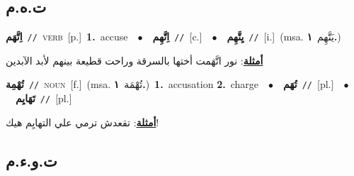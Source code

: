 \documentclass[10pt,a4paper,twoside]{article} %
\begin{document}
\begin{multicols}{2}
\vspace{-3mm}
\subsection*{\color{blue}\foreignlanguage{arabic}{ت.ه.م}\color{blue}{}} 

{\setlength\topsep{0pt}\textbf{\foreignlanguage{arabic}{اِتَّهَم}}\ {\color{gray}\texttt{//}\color{black}}\ \textsc{verb}\ [p.]\ \textbf{1.}~accuse\ \ $\bullet$\ \ \setlength\topsep{0pt}\textbf{\foreignlanguage{arabic}{اِتَّهِم}}\ {\color{gray}\texttt{//}\color{black}}\ [c.]\ \ $\bullet$\ \ \setlength\topsep{0pt}\textbf{\foreignlanguage{arabic}{يِتَّهِم}}\ {\color{gray}\texttt{//}\color{black}}\ [i.]\ \color{gray}(msa. \foreignlanguage{arabic}{يَتَّهِم}~\foreignlanguage{arabic}{\textbf{١.}})\color{black}\  \begin{flushright}\color{gray}\foreignlanguage{arabic}{\textbf{\underline{\foreignlanguage{arabic}{أمثلة}}}: نور اتَّهَمت أختها بالسرقة وراحت قطيعة بينهم لأبد الآبدين}\end{flushright}\color{black}} \vspace{2mm}

{\setlength\topsep{0pt}\textbf{\foreignlanguage{arabic}{تُهْمِة}}\ {\color{gray}\texttt{//}\color{black}}\ \textsc{noun}\ [f.]\ \color{gray}(msa. \foreignlanguage{arabic}{تُهْمَة}~\foreignlanguage{arabic}{\textbf{١.}})\color{black}\ \textbf{1.}~accusation  \textbf{2.}~charge\ \ $\bullet$\ \ \setlength\topsep{0pt}\textbf{\foreignlanguage{arabic}{تُهَم}}\ {\color{gray}\texttt{//}\color{black}}\ [pl.]\ \ $\bullet$\ \ \setlength\topsep{0pt}\textbf{\foreignlanguage{arabic}{تَهَايِم}}\ {\color{gray}\texttt{//}\color{black}}\ [pl.]\  \begin{flushright}\color{gray}\foreignlanguage{arabic}{\textbf{\underline{\foreignlanguage{arabic}{أمثلة}}}: تقعدش ترمي علي التهايِم هيك!}\end{flushright}\color{black}} \vspace{2mm}

\vspace{-3mm}
\subsection*{\color{blue}\foreignlanguage{arabic}{ت.و.ء.م}\color{blue}{}} 


\end{multicols}
\end{document}
